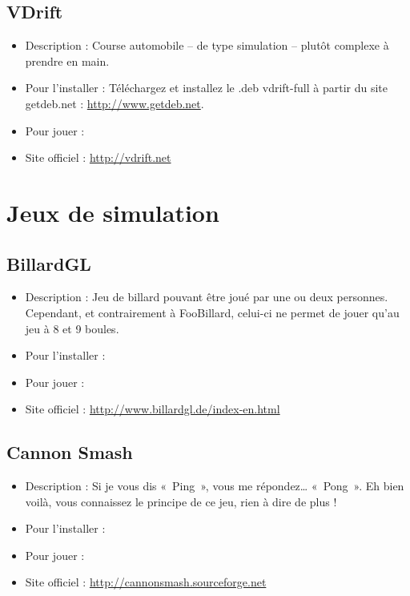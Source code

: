 \subsection{VDrift}
\begin{itemize}
\begingroup
{}
\item Description : Course automobile -- de type simulation -- plutôt complexe à prendre en main.{\par}
\item Pour l'installer : Téléchargez et installez le .deb vdrift-full à partir du site getdeb.net :
\url{http://www.getdeb.net}.{\par}
\item Pour jouer : 
\item Site officiel : \url{http://vdrift.net}{\par}
\endgroup
\end{itemize}
\section{Jeux de simulation}
\subsection{BillardGL}
\begin{itemize}
\begingroup
{}
\item Description : Jeu de billard pouvant être joué par une ou deux personnes. Cependant, et contrairement à FooBillard, celui-ci ne permet de jouer qu'au jeu à 8 et 9 boules.{\par}
\endgroup
\item Pour l'installer : 
\item Pour jouer : 
\item Site officiel : \url{http://www.billardgl.de/index-en.html}{\par}
\end{itemize}
\subsection{Cannon Smash}
\begin{itemize}
\begingroup
{}
\item Description : Si je vous dis «~Ping~», vous me répondez\ldots{} «~Pong~». Eh bien voilà, vous connaissez le principe de ce jeu, rien à dire de plus !{\par}
\item Pour l'installer : 
\item Pour jouer : 
\endgroup
\item Site officiel : \url{http://cannonsmash.sourceforge.net}{\par}
\end{itemize}
\newpage
